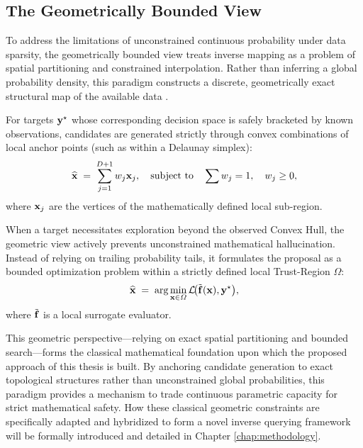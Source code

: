 \subsection{The Geometrically Bounded View}

To address the limitations of unconstrained continuous probability under data sparsity, the geometrically bounded view treats inverse mapping as a problem of spatial partitioning and constrained interpolation. Rather than inferring a global probability density, this paradigm constructs a discrete, geometrically exact structural map of the available data .

For targets $\mathbf{y}^\star$ whose corresponding decision space is safely bracketed by known observations, candidates are generated strictly through convex combinations of local anchor points (such as within a Delaunay simplex):
\begin{equation}
  \widehat{\mathbf{x}} \;=\; \sum_{j=1}^{D+1} w_j \mathbf{x}_j, \quad \text{subject to} \quad \sum w_j = 1, \quad w_j \geq 0,
  \label{eq:geometric_interpolation}
\end{equation}
where $\mathbf{x}_j$ are the vertices of the mathematically defined local sub-region. 

When a target necessitates exploration beyond the observed Convex Hull, the geometric view actively prevents unconstrained mathematical hallucination. Instead of relying on trailing probability tails, it formulates the proposal as a bounded optimization problem within a strictly defined local Trust-Region $\Omega$:
\begin{equation}
  \widehat{\mathbf{x}} \;=\; \arg\min_{\mathbf{x} \in \Omega} \mathcal{L}\!\big(\tilde{\mathbf{f}}(\mathbf{x}), \mathbf{y}^\star\big),
  \label{eq:geometric_trust_region}
\end{equation}
where $\tilde{\mathbf{f}}$ is a local surrogate evaluator. 

This geometric perspective—relying on exact spatial partitioning and bounded search—forms the classical mathematical foundation upon which the proposed approach of this thesis is built. By anchoring candidate generation to exact topological structures rather than unconstrained global probabilities, this paradigm provides a mechanism to trade continuous parametric capacity for strict mathematical safety. How these classical geometric constraints are specifically adapted and hybridized to form a novel inverse querying framework will be formally introduced and detailed in Chapter \ref{chap:methodology}.




